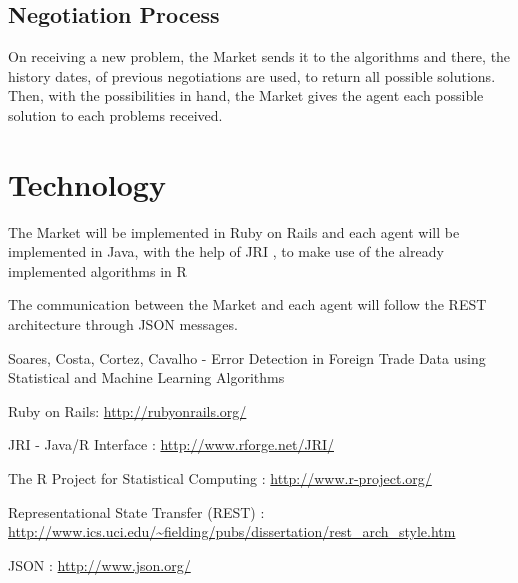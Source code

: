 \documentclass{llncs}
\begin{document}
\subsection{Negotiation Process}

On receiving a new problem, the Market sends it to the algorithms and there, the history dates, of previous negotiations are used, to return all possible solutions.
Then, with the possibilities in hand, the Market gives the agent each possible solution to each problems received.


\section{Technology}

The Market will be implemented in Ruby on Rails \cite{tec:RoR} and each agent will be implemented in Java, with the help of JRI \cite{tec:JRI}, to make use of the already implemented algorithms in R \cite{tec:R}

The communication between the Market and each agent will follow the REST architecture \cite{tec:REST} through JSON \cite{tec:JSON} messages.

\begin{thebibliography}{9}
Soares, Costa, Cortez, Cavalho - Error Detection in Foreign Trade Data   using Statistical and Machine Learning Algorithms

Ruby on Rails:
\url{http://rubyonrails.org/}

JRI - Java/R Interface : 
\url{http://www.rforge.net/JRI/}

The R Project for Statistical Computing :
\url{http://www.r-project.org/}

Representational State Transfer (REST) :
\url{http://www.ics.uci.edu/~fielding/pubs/dissertation/rest_arch_style.htm}

JSON :
\url{http://www.json.org/}



\end{thebibliography}
\end{document}
